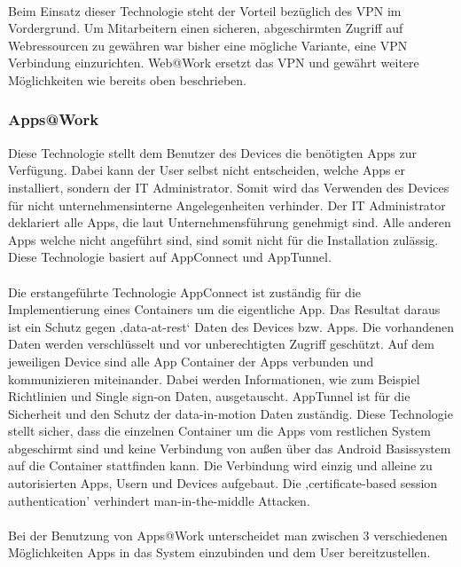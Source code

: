 \paragraph*{}
Beim Einsatz dieser Technologie steht der Vorteil bezüglich des VPN im Vordergrund. Um Mitarbeitern einen sicheren, abgeschirmten Zugriff auf Webressourcen zu gewähren war bisher eine mögliche Variante, eine VPN Verbindung einzurichten. Web@Work ersetzt das VPN und gewährt weitere Möglichkeiten wie bereits oben beschrieben.

\subsubsection{Apps@Work}
Diese Technologie stellt dem Benutzer des Devices die benötigten Apps zur Verfügung. Dabei kann der User selbst nicht entscheiden, welche Apps er installiert, sondern der IT Administrator. Somit wird das Verwenden des Devices für nicht unternehmensinterne Angelegenheiten verhinder. Der IT Administrator deklariert alle Apps, die laut Unternehmensführung genehmigt sind. Alle anderen Apps welche nicht angeführt sind, sind somit nicht für die Installation zulässig. Diese Technologie basiert auf AppConnect und AppTunnel.
\paragraph*{}
Die erstangeführte Technologie AppConnect ist zuständig für die Implementierung eines Containers um die eigentliche App. Das Resultat daraus ist ein Schutz gegen ‚data-at-rest‘ Daten des Devices bzw. Apps. Die vorhandenen Daten werden verschlüsselt und vor unberechtigten Zugriff geschützt. Auf dem jeweiligen Device sind alle App Container der Apps verbunden und kommunizieren miteinander. Dabei werden Informationen, wie zum Beispiel Richtlinien und Single sign-on Daten, ausgetauscht. \newline
AppTunnel ist für die Sicherheit und den Schutz der data-in-motion Daten zuständig. Diese Technologie stellt sicher, dass die einzelnen Container um die Apps vom restlichen System abgeschirmt sind und keine Verbindung von außen über das Android Basissystem auf die Container stattfinden kann. Die Verbindung wird einzig und alleine zu autorisierten Apps, Usern und Devices aufgebaut. Die ‚certificate-based session authentication’ verhindert man-in-the-middle Attacken.
\paragraph*{}
Bei der Benutzung von Apps@Work unterscheidet man zwischen 3 verschiedenen Möglichkeiten Apps in das System einzubinden und dem User bereitzustellen.

